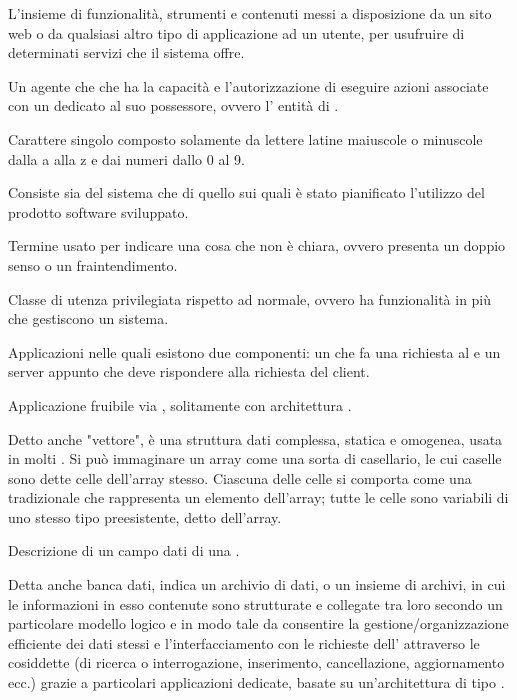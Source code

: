 \Inizio{}




{L'insieme di funzionalità, strumenti e contenuti messi a disposizione da un sito web o da qualsiasi altro tipo di applicazione ad un utente, per usufruire di determinati servizi che il sistema offre.}

{Un agente che che ha la capacità e l'autorizzazione di eseguire azioni associate con un  dedicato al suo possessore, ovvero l' entità di .}

{Carattere singolo composto solamente da lettere latine maiuscole o minuscole dalla a alla z e dai numeri dallo 0 al 9.}

{Consiste sia del sistema  che di quello  sui quali è stato pianificato l'utilizzo del prodotto software sviluppato.}

{Termine usato per indicare una cosa che non è chiara, ovvero presenta un doppio senso o un fraintendimento.}

{Classe di utenza privilegiata rispetto ad  normale, ovvero ha funzionalità in più che gestiscono un sistema.}

{Applicazioni nelle quali esistono due componenti: un  che fa una richiesta al  e un server appunto che deve rispondere alla richiesta del client.}

{Applicazione fruibile via , solitamente con architettura .}

{Detto anche "vettore", è una struttura dati complessa, statica e omogenea, usata in molti . Si può immaginare un array come una sorta di casellario, le cui caselle sono dette celle dell'array stesso. Ciascuna delle celle si comporta come una  tradizionale che rappresenta un elemento dell'array; tutte le celle sono variabili di uno stesso tipo preesistente, detto  dell'array.}

{Descrizione di un campo dati di una .}




{Detta anche banca dati, indica un archivio di dati, o un insieme di archivi, in cui le informazioni in esso contenute sono strutturate e collegate tra loro secondo un particolare modello logico e in modo tale da consentire la gestione/organizzazione efficiente dei dati stessi e l'interfacciamento con le richieste dell' attraverso le cosiddette  (di ricerca o interrogazione, inserimento, cancellazione, aggiornamento ecc.) grazie a particolari applicazioni  dedicate, basate su un'architettura di tipo .}

